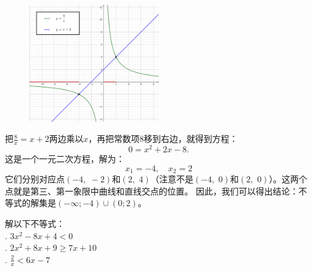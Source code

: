 \documentclass[12pt,UTF8]{ctexbook}
\begin{document}
\begin{figure}[h]
    \vspace{4pt}
    \centering
    \includegraphics[width=0.5\textwidth]{tu/一元二次不等式1.png}
\end{figure}

把$\frac{8}{x} = x + 2$两边乘以$x$，再把常数项$8$移到右边，就得到方程：
$$ 0 =  x^2 + 2x - 8.$$
这是一个一元二次方程，解为：
$$ x_1 = -4, \quad x_2 = 2$$
它们分别对应点$(-4, \,\,-2)$和$(2, \,\,4)$（注意不是$(-4, \,\,0)$和$(2, \,\,0)$）。这两个点就是第三、第一象限中曲线和直线交点的位置。
因此，我们可以得出结论：不等式的解集是$(-\infty; -4) \cup (0; 2)$。

\begin{xt}\label{xt:5-2-0}
    解以下不等式：\\
    . $3x^2 - 8x + 4 < 0$ \\
    . $2x^2 + 8x + 9 \geqslant 7x + 10$ \\
    . $\frac{2}{x} < 6x- 7$ 
\end{xt}
\end{document}
